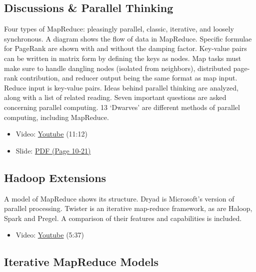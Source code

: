 \subsection{Discussions \& Parallel
Thinking}\label{discussions-parallel-thinking}

Four types of MapReduce: pleasingly parallel, classic, iterative, and
loosely synchronous. A diagram shows the flow of data in MapReduce.
Specific formulae for PageRank are shown with and without the damping
factor. Key-value pairs can be written in matrix form by defining the
keys as nodes. Map tasks must make sure to handle dangling nodes
(isolated from neighbors), distributed page-rank contribution, and
reducer output being the same format as map input. Reduce input is
key-value pairs. Ideas behind parallel thinking are analyzed, along with
a list of related reading. Seven important questions are asked
concerning parallel computing. 13 `Dwarves' are different methods of
parallel computing, including MapReduce.

\begin{itemize}
\tightlist
\item
  Video: \href{https://www.youtube.com/watch?v=ISJp7TUzo1s}{Youtube}
  (11:12)
\end{itemize}

\begin{itemize}
\tightlist
\item
  Slide:
  \href{https://drive.google.com/open?id=0B88HKpainTSfWFpEZGxqSWRTYms}{PDF
  (Page 10-21)}
\end{itemize}

\subsection{Hadoop Extensions}\label{hadoop-extensions}

A model of MapReduce shows its structure. Dryad is Microsoft's version
of parallel processing. Twister is an iterative map-reduce framework, as
are Haloop, Spark and Pregel. A comparison of their features and
capabilities is included.

\begin{itemize}
\tightlist
\item
  Video: \href{https://www.youtube.com/watch?v=gS7TImRZZ1g}{Youtube}
  (5:37)
\end{itemize}

\subsection{Iterative MapReduce
Models}\label{iterative-mapreduce-models}

